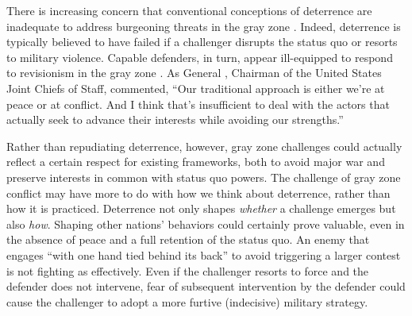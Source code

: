 \documentclass[11pt,letterpaper,pdftex,dvipsnames,table]{article}
\begin{document}
There is increasing concern that conventional conceptions of deterrence are inadequate to address burgeoning threats in the gray zone \citep{olson_americanotready_2015, pomerantsev_fightingfriendinggrey_2015, holmes_deterringchinagray_2017, matisek_shadesgraydeterrence_2017, hicks_othermeanspart_2019, pettyjohn_competinggrayzone_2019}. Indeed, deterrence is typically believed to have failed if a challenger disrupts the status quo or resorts to military violence. Capable defenders, in turn, appear ill-equipped to respond to revisionism in the gray zone \citep[51]{jackson_tacticsstrategiccompetition_2017}. As General \citet{dunford_gendunfordremarks_2016}, Chairman of the United States Joint Chiefs of Staff, commented, “Our traditional approach is either we’re at peace or at conflict. And I think that’s insufficient to deal with the actors that actually seek to advance their interests while avoiding our strengths.”

Rather than repudiating deterrence, however, gray zone challenges could actually reflect a certain respect for existing frameworks, both to avoid major war and preserve interests in common with status quo powers. The challenge of gray zone conflict may have more to do with how we think about deterrence, rather than how it is practiced. Deterrence not only shapes \textit{whether} a challenge emerges but also \textit{how}. Shaping other nations' behaviors could certainly prove valuable, even in the absence of peace and a full retention of the status quo. An enemy that engages ``with one hand tied behind its back'' to avoid triggering a larger contest is not fighting as effectively. Even if the challenger resorts to force and the defender does not intervene, fear of subsequent intervention by the defender could cause the challenger to adopt a more furtive (indecisive) military strategy.
\end{document}

